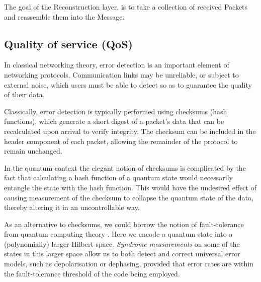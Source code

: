\documentclass[aps,rmp,twocolumn,amsmath,amssymb,nofootinbib,superscriptaddress]{revtex4}
\begin{document}
\begin{table}[!htb]
\caption{The goal of the {\sc Reconstruction} layer, is to take a collection of received {\sc Packets} and reassemble them into the {\sc Message}.} \label{tab:reconstruction}
\end{table}

%
%

\subsection{Quality of service (QoS)}

In classical networking theory, error detection is an important element of networking protocols. Communication links may be unreliable, or subject to external noise, which users must be able to detect so as to guarantee the quality of their data.

Classically, error detection is typically performed using checksums (hash functions), which generate a short digest of a packet's data that can be recalculated upon arrival to verify integrity. The checksum can be included in the header component of each packet, allowing the remainder of the protocol to remain unchanged.

In the quantum context the elegant notion of checksums is complicated by the fact that calculating a hash function of a quantum state would necessarily entangle the state with the hash function. This would have the undesired effect of causing measurement of the checksum to collapse the quantum state of the data, thereby altering it in an uncontrollable way.

As an alternative to checksums, we could borrow the notion of fault-tolerance from quantum computing theory \cite{???}. Here we encode a quantum state into a (polynomially) larger Hilbert space. \emph{Syndrome measurements} on some of the states in this larger space allow us to both detect and correct universal error models, such as depolarisation or dephasing, provided that error rates are within the fault-tolerance threshold of the code being employed.
\end{document}
